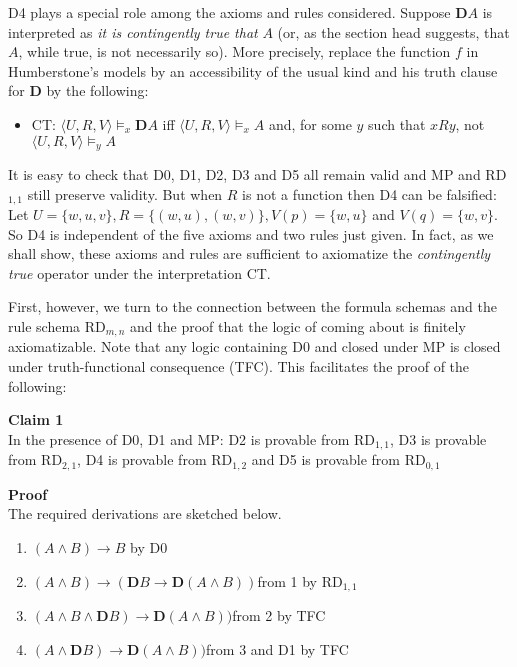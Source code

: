 \documentclass[
  10pt,
  letterpaper,
  DIV=11,
  numbers=noendperiod,
  twoside]{scrartcl}
\providecommand{\tightlist}{%
  \setlength{\itemsep}{0pt}\setlength{\parskip}{0pt}}\usepackage{longtable,booktabs,array}
\begin{document}
D4 plays a special role among the axioms and rules considered. Suppose
\(\mathbf{D}{A}\) is interpreted as \emph{it is contingently true that}
\(A\) (or, as the section head suggests, that \(A\), while true, is not
necessarily so). More precisely, replace the function \(f\) in
Humberstone's models by an accessibility of the usual kind and his truth
clause for \(\mathbf{D}\) by the following:

\begin{itemize}
\tightlist
\item
  CT: \(\langle U,R,V\!\rangle \models _x \mathbf{D}A\) iff
  \(\langle U,R,V\!\rangle \models _x A\) and, for some \(y\) such that
  \(xRy\), not \(\langle U,R,V\!\rangle \models _y A\)
\end{itemize}

It is easy to check that D0, D1, D2, D3 and D5 all remain valid and MP
and RD\(_{1,1}\) still preserve validity. But when \(R\) is not a
function then D4 can be falsified: Let
\(U=\{w,u,v\}, R=\{(w,u),(w,v)\}, V(p)=\{w,u\}\) and \(V(q)=\{w,v\}\).
So D4 is independent of the five axioms and two rules just given. In
fact, as we shall show, these axioms and rules are sufficient to
axiomatize the \emph{contingently true} operator under the
interpretation CT.

First, however, we turn to the connection between the formula schemas
and the rule schema RD\(_{m,n}\) and the proof that the logic of coming
about is finitely axiomatizable. Note that any logic containing D0 and
closed under MP is closed under truth-functional consequence (TFC). This
facilitates the proof of the following:

\textbf{Claim 1}\\
In the presence of D0, D1 and MP: D2 is provable from RD\(_{1,1}\), D3
is provable from RD\(_{2,1}\), D4 is provable from RD\(_{1,2}\) and D5
is provable from RD\(_{0,1}\)

\textbf{Proof}\\
The required derivations are sketched below.

\begin{enumerate}
\def\labelenumi{\arabic{enumi}.}
\tightlist
\item
  \((A\wedge B)\rightarrow B\) by D0
\item
  \((A\wedge B)\rightarrow (\mathbf{D}B\rightarrow \mathbf{D}(A\wedge B))\)from
  1 by RD\(_{1,1}\)
\item
  \((A\wedge B\wedge \mathbf{D}B)\rightarrow \mathbf{D}(A\wedge B))\)from
  2 by TFC
\item
  \((A\wedge \mathbf{D}B)\rightarrow \mathbf{D}(A\wedge B))\)from 3 and
  D1 by TFC
\end{enumerate}
\end{document}
